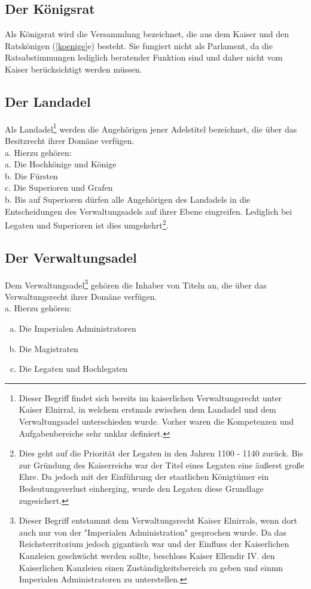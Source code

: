 \documentclass{article}
\begin{document}
\subsection{Der Königsrat }
Als Königsrat wird die Versammlung bezeichnet, die aus dem Kaiser und den Ratskönigen (\ref{koenige}e) besteht. Sie fungiert nicht als Parlament, da die Ratsabstimmungen lediglich beratender Funktion sind und daher nicht vom Kaiser berücksichtigt werden müssen.  

\subsection{Der Landadel}
Als Landadel\footnote{Dieser Begriff findet sich bereits im kaiserlichen Verwaltungsrecht unter Kaiser Elnirral, in welchem erstmals zwischen dem Landadel und dem Verwaltungsadel unterschieden wurde. Vorher waren die Kompetenzen und Aufgabenbereiche sehr unklar definiert.} werden die Angehörigen jener Adelstitel bezeichnet, die über das Besitzrecht ihrer Domäne verfügen.\\
a. Hierzu gehören: \\
a. Die Hochkönige und Könige  \\
b. Die Fürsten  \\
c. Die Superioren und Grafen  \\
b. Bis auf Superioren dürfen alle Angehörigen des Landadels in die Entscheidungen des Verwaltungsadels auf ihrer Ebene eingreifen. Lediglich bei Legaten und Superioren ist dies umgekehrt\footnote{Dies geht auf die Priorität der Legaten in den Jahren 1100 - 1140 zurück. Bis zur Gründung des Kaiserreichs war der Titel eines Legaten eine äußerst große Ehre. Da jedoch mit der Einführung der staatlichen Königtümer ein Bedeutungsverlust einherging, wurde den Legaten diese Grundlage zugesichert.}.

\subsection{Der Verwaltungsadel}
Dem Verwaltungsadel\footnote{Dieser Begriff entstammt dem Verwaltungsrecht Kaiser Elnirrals, wenn dort auch nur von der "Imperialen Administration" gesprochen wurde. Da das Reichsterritorium jedoch gigantisch war und der Einfluss der Kaiserlichen Kanzleien geschwächt werden sollte, beschloss Kaiser Ellendir IV. den Kaiserlichen Kanzleien einen Zuständigkeitsbereich zu geben und einmn Imperialen Administratoren zu unterstellen.} gehören die Inhaber von Titeln an, die über das Verwaltungsrecht ihrer Domäne verfügen.  \\
a. Hierzu gehören:
\begin{enumerate}[a)]
	\item Die Imperialen Administratoren
	\item Die Magistraten
	\item Die Legaten und Hochlegaten
\end{enumerate}
\end{document}
